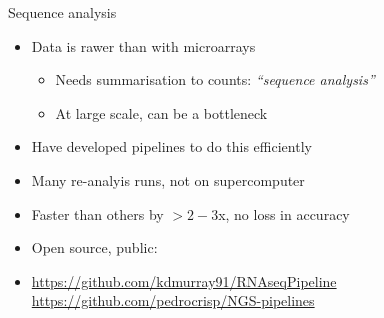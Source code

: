 \documentclass[t]{beamer}
\begin{document}
\begin{frame}{Sequence analysis}
  \begin{itemize}
    \item Data is rawer than with microarrays
    \begin{itemize}
      \item Needs summarisation to counts: \textit{``sequence analysis''}
      \item At large scale, can be a bottleneck
    \end{itemize}
    \pause
    \item Have developed pipelines to do this efficiently
    \pause
    \item Many re-analyis runs, not on supercomputer
    \pause
    \item Faster than others by $>2-3$x, no loss in accuracy
    \pause
    \item Open source, public:
    \item \tiny{\url{https://github.com/kdmurray91/RNAseqPipeline}\\
                \url{https://github.com/pedrocrisp/NGS-pipelines}}
  \end{itemize}
\end{frame}
\end{document}
